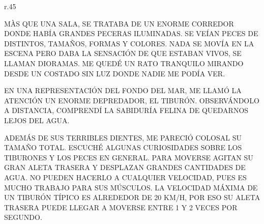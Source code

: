 \newpage
{}
\begin{wrapfigure}[8]{r}{.45\textwidth}\vspace{-1.25cm}%
\end{wrapfigure}
MÀS QUE UNA SALA, SE TRATABA DE UN ENORME CORREDOR DONDE HABÍA GRANDES PECERAS ILUMINADAS. SE VEÍAN PECES DE DISTINTOS, TAMAÑOS, FORMAS Y COLORES. NADA SE MOVÍA EN LA ESCENA PERO DABA LA SENSACIÓN DE QUE ESTABAN VIVOS, SE LLAMAN DIORAMAS. ME QUEDÉ UN RATO TRANQUILO MIRANDO DESDE UN COSTADO SIN LUZ DONDE NADIE ME PODÍA VER.

EN UNA REPRESENTACIÓN DEL FONDO DEL MAR, ME LLAMÓ LA ATENCIÓN UN ENORME DEPREDADOR, EL TIBURÓN. OBSERVÁNDOLO A DISTANCIA, COMPRENDÍ LA SABIDURÍA FELINA DE QUEDARNOS LEJOS DEL AGUA.


\newpage
{}

ADEMÁS DE SUS TERRIBLES DIENTES, ME PARECIÓ COLOSAL SU TAMAÑO TOTAL. ESCUCHÉ ALGUNAS CURIOSIDADES SOBRE LOS TIBURONES Y LOS PECES EN GENERAL. PARA MOVERSE AGITAN SU GRAN ALETA TRASERA Y DESPLAZAN GRANDES CANTIDADES DE AGUA. NO PUEDEN HACERLO A CUALQUIER VELOCIDAD, PUES ES MUCHO TRABAJO PARA SUS MÚSCULOS. LA VELOCIDAD MÁXIMA DE UN TIBURÓN TÍPICO ES ALREDEDOR DE 20 KM/H, POR ESO SU ALETA TRASERA PUEDE LLEGAR A MOVERSE ENTRE 1 Y 2 VECES POR SEGUNDO. 

